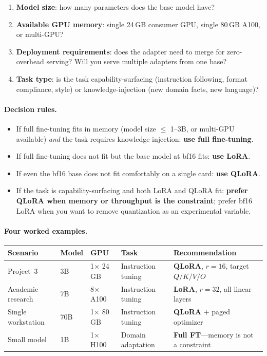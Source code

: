 \begin{enumerate}[nosep]
  \item \textbf{Model size}: how many parameters does the base model have?
  \item \textbf{Available GPU memory}: single 24\,GB consumer GPU, single 80\,GB A100, or multi-GPU?
  \item \textbf{Deployment requirements}: does the adapter need to merge for zero-overhead serving? Will you serve multiple adapters from one base?
  \item \textbf{Task type}: is the task capability-surfacing (instruction following, format compliance, style) or knowledge-injection (new domain facts, new language)?
\end{enumerate}

\paragraph{Decision rules.}

\begin{itemize}[nosep]
  \item If full fine-tuning fits in memory (model size $\leq$ 1--3B, or multi-GPU available) \emph{and} the task requires knowledge injection: \textbf{use full fine-tuning}.
  \item If full fine-tuning does not fit but the base model at bf16 fits: \textbf{use LoRA}.
  \item If even the bf16 base does not fit comfortably on a single card: \textbf{use QLoRA}.
  \item If the task is capability-surfacing and both LoRA and QLoRA fit: \textbf{prefer QLoRA when memory or throughput is the constraint}; prefer bf16 LoRA when you want to remove quantization as an experimental variable.
\end{itemize}

\paragraph{Four worked examples.}

\begin{center}
\begin{tabularx}{\textwidth}{@{}p{3cm}p{2.5cm}p{2.5cm}p{2.5cm}X@{}}
\toprule
\textbf{Scenario} & \textbf{Model} & \textbf{GPU} & \textbf{Task} & \textbf{Recommendation} \\
\midrule
Project~3 & 3B & 1$\times$ 24\,GB & Instruction tuning & \textbf{QLoRA}, $r = 16$, target $Q/K/V/O$ \\
Academic research & 7B & 8$\times$ A100 & Instruction tuning & \textbf{LoRA}, $r = 32$, all linear layers \\
Single workstation & 70B & 1$\times$ 80\,GB & Instruction tuning & \textbf{QLoRA} + paged optimizer \\
Small model & 1B & 1$\times$ H100 & Domain adaptation & \textbf{Full FT}---memory is not a constraint \\
\bottomrule
\end{tabularx}
\end{center}

